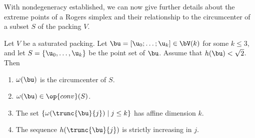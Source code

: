 With nondegeneracy established, we can now give further details about
the extreme points of a Rogers simplex and their relationship to the
circumcenter of a subset $S$ of the packing $V$.

\begin{lemma}\label{lemma:v2} 
Let $V$ be a saturated packing.
Let $\bu=[\u_0;\ldots;\u_k]\in \bV(k)$ for some $k\le 3$,
and let $S=\{\u_0,\ldots,\u_k\}$ be the
point set of $\bu$.
Assume that $h(\bu)<\sqrt2$.
Then 
\begin{enumerate} 
\item%
$\omega(\bu)$ is the circumcenter of $S$.
\item%
$\omega(\bu)\in\op{conv}(S)$.
\item%
The set $\{\omega(\trunc{\bu}{j})\mid j\le k\}$ has affine dimension $k$.
\item
The sequence $h(\trunc{\bu}{j})$ is
strictly increasing in $j$.
\end{enumerate}
\end{lemma}
%

